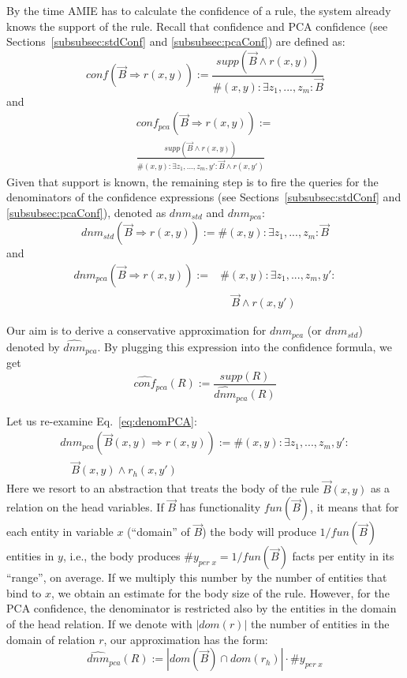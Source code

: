 By the time AMIE has to calculate the confidence of a rule, the system already knows the support of the rule.
Recall that confidence and PCA confidence (see Sections~\ref{subsubsec:stdConf} and \ref{subsubsec:pcaConf}) are defined as:
\[conf(\vec{B} \Rightarrow r(x,y)) := \frac{supp(\vec{B} \wedge r(x,y))}{\#(x,y): \exists z_1,...,z_m: \vec{B}}\]
and
\begin{multline*}
conf_{pca}(\vec{B} \Rightarrow r(x,y)) :=\\
\frac{supp(\vec{B} \wedge r(x,y))}{\#(x,y): \exists z_1,...,z_m,y': \vec{B} \wedge r(x,y')}
\end{multline*}
\noindent Given that support is known, the remaining step is to fire the queries for the denominators of the confidence expressions
(see Sections~\ref{subsubsec:stdConf} and \ref{subsubsec:pcaConf}), denoted as $dnm_{std}$ and $dnm_{pca}$:
\begin{equation} \label{eq:denomStandardConf}
 dnm_{std}(\vec{B} \Rightarrow r(x,y)):= \#(x,y): \exists z_1,...,z_m: \vec{B}
\end{equation}
and
\begin{equation} \label{eq:denomPCA}
\begin{array}{rl}
dnm_{pca}(\vec{B} \Rightarrow r(x,y)) := {}& \#(x,y): \exists z_1,...,z_m,y': \\ &\quad \vec{B} \wedge r(x,y')
\end{array}
\end{equation}



Our aim is to derive a conservative approximation for $dnm_{pca}$ (or $dnm_{std}$) denoted by
$\widehat{dnm}_{pca}$. By plugging this expression into the confidence formula, we get
\begin{equation} \label{eq:pcaApproxConf}
  \widehat{conf}_{pca}(R):=\frac{supp(R)}{\widehat{dnm}_{pca}(R)}
\end{equation}

Let us re-examine Eq.~\ref{eq:denomPCA}:
\[
\begin{array}{rl}
 dnm_{pca}(\vec{B}(x,y) \Rightarrow r(x,y)) := {} \#(x,y): \exists z_1,...,z_m,y': \\ \quad \vec{B}(x, y) \wedge r_h(x,y')
\end{array}
\]
Here we resort to an abstraction that treats the body of the rule $\vec{B}(x, y)$ as a relation on the head variables. 
If $\vec{B}$ has functionality $fun(\vec{B})$, it means that for each entity in variable $x$ (``domain'' of $\vec{B}$) the body will produce $1/fun(\vec{B})$ entities in $y$,
i.e., the body produces $\#y_{per\; x} = 1/fun(\vec{B})$ facts per entity in its ``range'', on average. If we multiply this number
by the number of entities that bind to $x$, we obtain an estimate for the body size of the rule. 
However, for the PCA confidence, the denominator is restricted also by the entities in the domain of the head relation.
If we denote with $|dom(r)|$ the number of entities in the domain of relation $r$, our approximation has the form:
\begin{equation} \label{eq:pcaApproxConf_general}
  \widehat{dnm}_{pca}(R):=|dom(\vec{B}) \cap dom(r_h)|\cdot \#y_{per\; x}
\end{equation}

